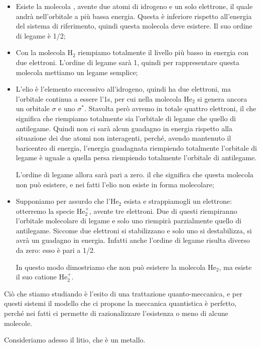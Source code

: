 \begin{itemize}
    \item Esiste la molecola , avente due atomi di idrogeno e un solo elettrone, il quale andrà nell'orbitale a più bassa energia. Questa è inferiore rispetto all'energia del sistema di riferimento, quindi questa molecola deve esistere. Il suo ordine di legame è 1/2;
    \item Con la molecola H$_2$ riempiamo totalmente il livello più basso in energia con due elettroni. L'ordine di legame sarà 1, quindi per rappresentare questa molecola mettiamo un legame semplice;
    \item L'elio è l'elemento successivo all'idrogeno, quindi ha due elettroni, ma l'orbitale continua a essere l'1s, per cui nella molecola He$_2$ si genera ancora un orbitale $\sigma$ e uno $\sigma^*$. Stavolta però avremo in totale quattro elettroni, il che significa che riempiamo totalmente sia l'orbitale di legame che quello di antilegame. Quindi non ci sarà alcun guadagno in energia rispetto alla situazione dei due atomi non interagenti, perché, avendo mantenuto il baricentro di energia, l'energia guadagnata riempiendo totalmente l'orbitale di legame è uguale a quella persa riempiendo totalmente l'orbitale di antilegame.

    L'ordine di legame allora sarà pari a zero. il che significa che questa molecola non può esistere, e nei fatti l'elio non esiste in forma molecolare;
    \item Supponiamo per assurdo che l'He$_2$ esista e strappiamogli un elettrone: otterremo la specie He$_2^+$, avente tre elettroni. Due di questi riempiranno l'orbitale molecolare di legame e solo uno riempirà parzialmente quello di antilegame. Siccome due elettroni si stabilizzano e solo uno si destabilizza, si avrà un guadagno in energia. Infatti anche l'ordine di legame risulta diverso da zero: esso è pari a 1/2.

    In questo modo dimostriamo che non può esistere la molecola He$_2$, ma esiste il suo catione He$_2^+$.
\end{itemize}

Ciò che stiamo studiando è l'esito di una trattazione quanto-meccanica, e per questi sistemi il modello che ci propone la meccanica quantistica è perfetto, perché nei fatti ci permette di razionalizzare l'esistenza o meno di alcune molecole.

\newpage

Consideriamo adesso il litio, che è un metallo.

